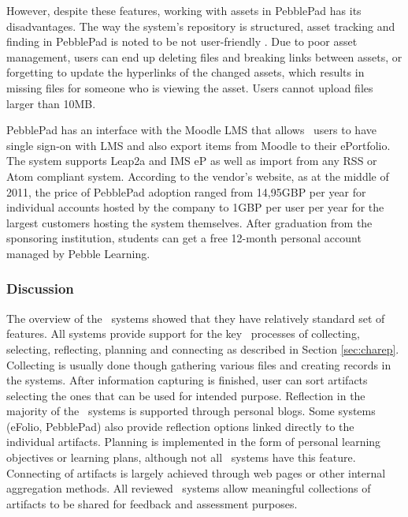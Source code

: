 However, despite these features, working with assets in PebblePad has its
disadvantages. The way the system's repository is structured, asset tracking and
finding in PebblePad is noted to be not user-friendly \citep{Overton2009}. Due
to poor asset management, users can end up deleting files and breaking links
between assets, or forgetting to update the hyperlinks of the changed assets,
which results in missing files for someone who is viewing the asset. Users
cannot upload files larger than 10MB.

PebblePad has an interface with the Moodle LMS that allows \ep~users to have
single sign-on with LMS and also export items from Moodle to their ePortfolio.
The system supports Leap2a and IMS eP as well as import from any RSS or Atom
compliant system. According to the vendor's website, as at the middle of 2011,
the price of PebblePad adoption ranged from 14,95GBP per year for individual
accounts hosted by the company to 1GBP per user per year for the largest
customers hosting the system themselves. After graduation from the sponsoring
institution, students can get a free 12-month personal account managed by Pebble
Learning.

\subsubsection{Discussion}
The overview of the \ep~systems showed that they have relatively standard set of
features. All systems provide support for the key \ep~processes of collecting,
selecting, reflecting, planning and connecting as described in Section
\ref{sec:charep}. Collecting is usually done though gathering various files and
creating records in the systems. After information capturing is finished, user
can sort artifacts selecting the ones that can be used for intended purpose.
Reflection in the majority of the \ep~systems is supported through personal
blogs. Some systems (eFolio, PebblePad) also provide reflection options linked
directly to the individual artifacts. Planning is implemented in the form of
personal learning objectives or learning plans, although not all \ep~systems
have this feature. Connecting of artifacts is largely achieved through web pages
or other internal aggregation methods. All reviewed \ep~systems allow meaningful
collections of artifacts to be shared for feedback and assessment purposes.

